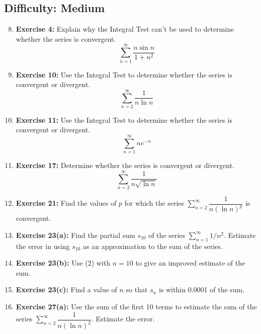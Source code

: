 \documentclass[12pt, a4paper]{article}
\begin{document}
\subsection*{Difficulty: Medium}
\begin{enumerate}
    \setcounter{enumi}{7}
    \item \textbf{Exercise 4:} Explain why the Integral Test can't be used to determine whether the series is convergent.
    \[ \sum_{n=1}^{\infty} \dfrac{n \sin n}{1 + n^2} \]
    
    \item \textbf{Exercise 10:} Use the Integral Test to determine whether the series is convergent or divergent.
    \[ \sum_{n=2}^{\infty} \dfrac{1}{n \ln n} \]

    \item \textbf{Exercise 11:} Use the Integral Test to determine whether the series is convergent or divergent.
    \[ \sum_{n=1}^{\infty} n e^{-n} \]
    
    \item \textbf{Exercise 17:} Determine whether the series is convergent or divergent.
    \[ \sum_{n=2}^{\infty} \dfrac{1}{n \sqrt{\ln n}} \]
    
    \item \textbf{Exercise 21:} Find the values of $p$ for which the series $\sum_{n=2}^{\infty} \dfrac{1}{n (\ln n)^p}$ is convergent.

    \item \textbf{Exercise 23(a):} Find the partial sum $s_{10}$ of the series $\sum_{n=1}^{\infty} 1/n^2$. Estimate the error in using $s_{10}$ as an approximation to the sum of the series.
    
    \item \textbf{Exercise 23(b):} Use (2) with $n=10$ to give an improved estimate of the sum.
    
    \item \textbf{Exercise 23(c):} Find a value of $n$ so that $s_n$ is within 0.0001 of the sum.
    
    \item \textbf{Exercise 27(a):} Use the sum of the first 10 terms to estimate the sum of the series $\sum_{n=2}^{\infty} \dfrac{1}{n(\ln n)^2}$. Estimate the error.
\end{enumerate}

\hrulefill
\vspace{1em}
\end{document}
